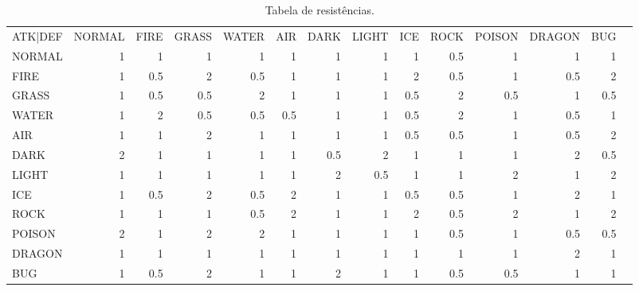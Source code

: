 \documentclass[
	12pt,				%
	openright,			%
	twoside,			%
	a4paper,			%
	english,			%
	french,				%
	spanish,			%
	brazil				%
	]{abntex2}
\begin{document}
\begin{table}[!htp]\centering
\caption{Tabela de resistências.}\label{resistance}
\scriptsize
\begin{tabular}{lrrrrrrrrrrrrr}\toprule
ATK|DEF &NORMAL &FIRE &GRASS &WATER &AIR &DARK &LIGHT &ICE &ROCK &POISON &DRAGON &BUG \\\cmidrule{1-13}
NORMAL &1 &1 &1 &1 &1 &1 &1 &1 &\cellcolor[HTML]{e06666}0.5 &1 &1 &1 \\\cmidrule{1-13}
FIRE &1 &\cellcolor[HTML]{e06666}0.5 &\cellcolor[HTML]{00ff00}2 &\cellcolor[HTML]{e06666}0.5 &1 &1 &1 &\cellcolor[HTML]{00ff00}2 &\cellcolor[HTML]{e06666}0.5 &1 &\cellcolor[HTML]{e06666}0.5 &\cellcolor[HTML]{00ff00}2 \\\cmidrule{1-13}
GRASS &1 &\cellcolor[HTML]{e06666}0.5 &\cellcolor[HTML]{e06666}0.5 &\cellcolor[HTML]{00ff00}2 &1 &1 &1 &\cellcolor[HTML]{e06666}0.5 &\cellcolor[HTML]{00ff00}2 &\cellcolor[HTML]{e06666}0.5 &1 &\cellcolor[HTML]{e06666}0.5 \\\cmidrule{1-13}
WATER &1 &\cellcolor[HTML]{00ff00}2 &\cellcolor[HTML]{e06666}0.5 &\cellcolor[HTML]{e06666}0.5 &\cellcolor[HTML]{e06666}0.5 &1 &1 &\cellcolor[HTML]{e06666}0.5 &\cellcolor[HTML]{00ff00}2 &1 &\cellcolor[HTML]{e06666}0.5 &1 \\\cmidrule{1-13}
AIR &1 &1 &\cellcolor[HTML]{00ff00}2 &1 &1 &1 &1 &\cellcolor[HTML]{e06666}0.5 &\cellcolor[HTML]{e06666}0.5 &1 &\cellcolor[HTML]{e06666}0.5 &\cellcolor[HTML]{00ff00}2 \\\cmidrule{1-13}
DARK &\cellcolor[HTML]{00ff00}2 &1 &1 &1 &1 &\cellcolor[HTML]{e06666}0.5 &\cellcolor[HTML]{00ff00}2 &1 &1 &1 &\cellcolor[HTML]{00ff00}2 &\cellcolor[HTML]{e06666}0.5 \\\cmidrule{1-13}
LIGHT &1 &1 &1 &1 &1 &\cellcolor[HTML]{00ff00}2 &\cellcolor[HTML]{e06666}0.5 &1 &1 &\cellcolor[HTML]{00ff00}2 &1 &\cellcolor[HTML]{00ff00}2 \\\cmidrule{1-13}
ICE &1 &\cellcolor[HTML]{e06666}0.5 &\cellcolor[HTML]{00ff00}2 &\cellcolor[HTML]{e06666}0.5 &\cellcolor[HTML]{00ff00}2 &1 &1 &\cellcolor[HTML]{e06666}0.5 &\cellcolor[HTML]{e06666}0.5 &1 &\cellcolor[HTML]{00ff00}2 &1 \\\cmidrule{1-13}
ROCK &1 &1 &1 &\cellcolor[HTML]{e06666}0.5 &\cellcolor[HTML]{00ff00}2 &1 &1 &\cellcolor[HTML]{00ff00}2 &\cellcolor[HTML]{e06666}0.5 &\cellcolor[HTML]{00ff00}2 &1 &\cellcolor[HTML]{00ff00}2 \\\cmidrule{1-13}
POISON &\cellcolor[HTML]{00ff00}2 &1 &\cellcolor[HTML]{00ff00}2 &\cellcolor[HTML]{00ff00}2 &1 &1 &1 &1 &\cellcolor[HTML]{e06666}0.5 &1 &\cellcolor[HTML]{e06666}0.5 &\cellcolor[HTML]{e06666}0.5 \\\cmidrule{1-13}
DRAGON &1 &1 &1 &1 &1 &1 &1 &1 &1 &1 &\cellcolor[HTML]{00ff00}2 &1 \\\cmidrule{1-13}
BUG &1 &\cellcolor[HTML]{e06666}0.5 &\cellcolor[HTML]{00ff00}2 &1 &1 &\cellcolor[HTML]{00ff00}2 &1 &1 &\cellcolor[HTML]{e06666}0.5 &\cellcolor[HTML]{e06666}0.5 &1 &1 \\\midrule
\bottomrule
\end{tabular}
\end{table}
\end{document}
